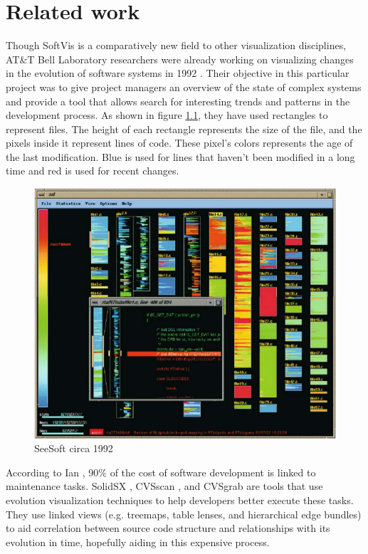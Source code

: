 \chapter{Related work} \label{sec:related}
Though SoftVis is a comparatively new field to other visualization disciplines, AT\&T Bell Laboratory researchers were already working on visualizing changes in the evolution of software systems in 1992 \cite{seesoft}. Their objective in this particular project was to give project managers an overview of the state of complex systems and provide a tool that allows search for interesting trends and patterns in the development process. As shown in figure \ref{fig:seesoft}, they have used rectangles to represent files. The height of each rectangle represents the size of the file, and the pixels inside it represent lines of code. These pixel's colors represents the age of the last modification. Blue is used for lines that haven't been modified in a long time and red is used for recent changes.

\begin{figure}[H]
	\centering
	\includegraphics[width=1.0\textwidth]{figures/seesoft.png}
	\caption{SeeSoft circa 1992}
	\label{fig:seesoft}
\end{figure}

According to Ian \citet{Sommerville:2004:SE:983346}, 90\% of the cost of software development is linked to maintenance tasks. SolidSX \cite{ref:solid}, CVSscan \cite{voinea2005}, and CVSgrab \cite{VisSym:EuroVis06:187-194} are tools that use evolution visualization techniques to help developers better execute these tasks. They use linked views (e.g. treemaps, table lenses, and hierarchical edge bundles) to aid correlation between source code structure and relationships with its evolution in time, hopefully aiding in this expensive process.

